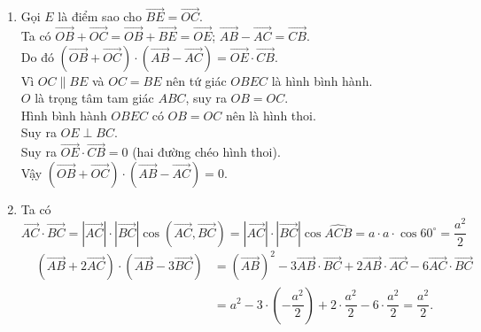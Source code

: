 \begin{vd}
{\begin{enumerate}
		Suy ra $\widehat{BAD}=\widehat{DAC}+\widehat{BAC}=60^{\circ}+60^{\circ}=120^{\circ}$.
		\begin{center}
			$\vec{AB} \cdot \vec{BC}=\vec{AB} \cdot \vec{AD}=\left|\vec{AB}\right|\cdot\left|\vec{AD}\right|\cos\left(\vec{AB},\vec{AD}\right)=\left|\vec{AB}\right|\cdot\left|\vec{AD}\right|\cos\widehat{BAD}=a\cdot a \cdot \cos 120^{\circ}=-\dfrac{a^2}{2}$.
		\end{center}
		\item Gọi $E$ là điểm sao cho $\vec{BE}=\vec{OC}$.\\
		Ta có $\vec{OB}+\vec{OC}=\vec{OB}+\vec{BE}=\vec{OE}$; $\vec{AB}-\vec{AC}=\vec{CB}$.\\
		Do đó $\left(\vec{OB}+\vec{OC}\right)\cdot \left(\vec{AB}-\vec{AC}\right)=\vec{OE}\cdot \vec{CB}$.\\
		Vì $OC\parallel BE$ và $OC=BE$ nên tứ giác $OBEC$ là hình bình hành.\\
		$O$ là trọng tâm tam giác $ABC$, suy ra $OB=OC$.\\
		Hình bình hành $OBEC$ có $OB=OC$ nên là hình thoi.\\
		Suy ra $OE\perp BC$.\\
		Suy ra $\vec{OE}\cdot \vec{CB}=0$ (hai đường chéo hình thoi).\\
		Vậy $\left(\vec{OB}+\vec{OC}\right)\cdot \left(\vec{AB}-\vec{AC}\right)=0$.
		\item Ta có
		$\vec{AC}\cdot\vec{BC}=\left|\vec{AC}\right|\cdot\left|\vec{BC}\right|\cos\left(\vec{AC},\vec{BC}\right)=\left|\vec{AC}\right|\cdot\left|\vec{BC}\right|\cos\widehat{ACB}=a\cdot a\cdot \cos 60^{\circ}=\dfrac{a^2}{2}$
		\allowdisplaybreaks
		\begin{eqnarray*}
			&\left(\vec{AB}+2\vec{AC}\right)\cdot \left(\vec{AB}-3\vec{BC}\right) & =\left(\vec{AB}\right)^2-3\vec{AB}\cdot\vec{BC} +2\vec{AB}\cdot\vec{AC}-6\vec{AC}\cdot\vec{BC}\\
			& &=a^2-3\cdot \left( -\dfrac{a^2}{2} \right) +2 \cdot \dfrac{a^2}{2}-6 \cdot \dfrac{a^2}{2} = \dfrac{a^2}{2}.
		\end{eqnarray*}
	\end{enumerate}}
\end{vd}
